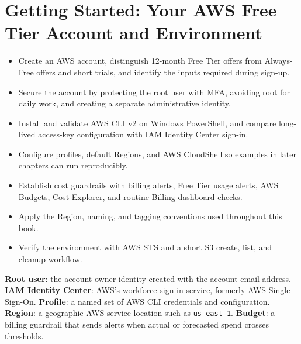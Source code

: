 \chapter{Getting Started: Your AWS Free Tier Account and Environment}
%
%

\begin{objectives}
\begin{itemize}
    \item Create an AWS account, distinguish 12-month Free Tier offers from Always-Free offers and short trials, and identify the inputs required during sign-up.
    \item Secure the account by protecting the root user with MFA, avoiding root for daily work, and creating a separate administrative identity.
    \item Install and validate AWS CLI v2 on Windows PowerShell, and compare long-lived access-key configuration with IAM Identity Center sign-in.
    \item Configure profiles, default Regions, and AWS CloudShell so examples in later chapters can run reproducibly.
    \item Establish cost guardrails with billing alerts, Free Tier usage alerts, AWS Budgets, Cost Explorer, and routine Billing dashboard checks.
    \item Apply the Region, naming, and tagging conventions used throughout this book.
    \item Verify the environment with AWS STS and a short S3 create, list, and cleanup workflow.
\end{itemize}
\end{objectives}

\begin{keyterms}
\textbf{Root user}: the account owner identity created with the account email address. \textbf{IAM Identity Center}: AWS's workforce sign-in service, formerly AWS Single Sign-On. \textbf{Profile}: a named set of AWS CLI credentials and configuration. \textbf{Region}: a geographic AWS service location such as \texttt{us-east-1}. \textbf{Budget}: a billing guardrail that sends alerts when actual or forecasted spend crosses thresholds.
\end{keyterms}

